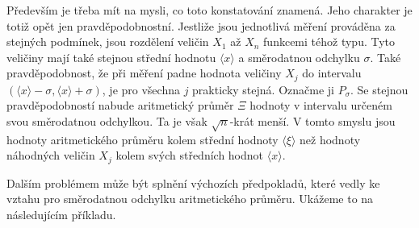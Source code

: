       Především je třeba mít na mysli, co toto konstatování znamená. Jeho charakter je totiž
      opět jen pravděpodobnostní. Jestliže jsou jednotlivá měření prováděna za stejných podmínek,
      jsou rozdělení veličin \(X_1\) až \(X_n\) funkcemi téhož typu. Tyto veličiny mají také 
      stejnou střední hodnotu \(\langle x \rangle\) a směrodatnou odchylku \(\sigma\). Také 
      pravděpodobnost, že při měření padne hodnota veličiny \(X_j\) do intervalu \((\langle x 
      \rangle - \sigma, \langle x \rangle + \sigma)\), je pro všechna \(j\) prakticky stejná. 
      Označme ji \(P_\sigma\).  Se stejnou pravděpodobností nabude aritmetický průměr \(\Xi\) 
      hodnoty v intervalu určeném svou směrodatnou odchylkou. Ta je však \(\sqrt{n}\)-krát menší. V 
      tomto smyslu jsou hodnoty aritmetického průměru  kolem 
      střední hodnoty \(\langle\xi \rangle\) než hodnoty náhodných veličin \(X_j\) kolem svých 
      středních hodnot \(\langle x \rangle\).
      
      Dalším problémem může být splnění výchozích předpokladů, které vedly ke vztahu pro
      směrodatnou odchylku aritmetického průměru. Ukážeme to na následujícím příkladu.
      
      
      
      
      
